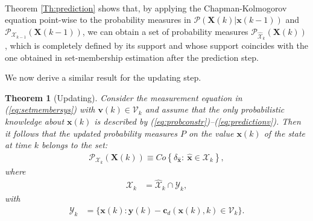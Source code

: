 \documentclass[twocolumn]{autart}
\newtheorem{theorem}{Theorem}
\begin{document}
   ~\\
   {
Theorem \ref{Th:prediction} shows that, by applying  the Chapman-Kolmogorov equation point-wise to the probability measures in $\mathcal{P}(\mathbf{X}(k)|\mathbf{x}(k-1))$ and $\mathcal{P}_{\mathcal{X}_{k-1}}(\mathbf{X}(k-1))$, we can obtain a set of probability measures $\mathcal{P}_{\hat{\mathcal{X}}_k}(\mathbf{X}(k))$,
which is completely defined by its support and whose support coincides with the one obtained in set-membership estimation after the prediction step.}

We now derive a similar result for  the updating step.


\begin{theorem}[Updating] \label{Th:updating}
 Consider the measurement equation in (\ref{eq:setmembersys}) with $\mathbf{v}(k) \in \mathcal{V}_k$ and assume
 that the only  probabilistic knowledge about $\mathbf{x}(k)$ is described by (\ref{eq:probconstr})--(\ref{eq:predictionv}).
 Then it follows that the updated probability measures $P$ on the value $\mathbf{x}(k)$ of the state at time $k$ belongs to the set:
 \begin{equation}
\label{eq:probconstr1}
\begin{array}{l}
\mathcal{P}_{\mathcal{X}_{k}}(\mathbf{X}(k))\equiv Co\left\{\delta_{\hat{\mathbf{x}}}:~\hat{\mathbf{x}}\in  {\mathcal{{X}}_k}\right\}, %
 \end{array}
\end{equation}
where
 \begin{align} \label{eq:defXk2}
{\mathcal{X}_{k}}&={\hat{\mathcal{X}}_{k}} \cap \mathcal{Y}_{k},
\end{align}
with
\begin{align} \label{def:Yk}
 \mathcal{Y}_{k}&=\{\mathbf{x}(k): \mathbf{y}(k)-\mathbf{c}_d(\mathbf{x}(k),k)\in \mathcal{V}_k\}.
 \end{align}
\end{theorem}
\end{document}
